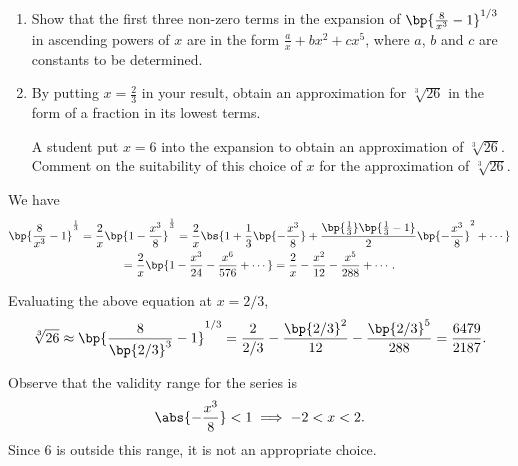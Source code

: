 \clearpage
\begin{problem}
    \begin{enumerate}
        \item Show that the first three non-zero terms in the expansion of $\bp{\frac8{x^3} - 1}^{1/3}$ in ascending powers of $x$ are in the form $\frac{a}x + bx^2 + cx^5$, where $a$, $b$ and $c$ are constants to be determined.
        \item By putting $x = \frac23$ in your result, obtain an approximation for $\sqrt[3]{26}$ in the form of a fraction in its lowest terms.

        A student put $x = 6$ into the expansion to obtain an approximation of $\sqrt[3]{26}$. Comment on the suitability of this choice of $x$ for the approximation of $\sqrt[3]{26}$.
    \end{enumerate}
\end{problem}
\begin{solution}
    \begin{ppart}
        We have
        \begin{gather*}
            \bp{\frac8{x^3} - 1}^{\frac13} = \frac2x \bp{1 - \frac{x^3}8}^{\frac13} = \frac2x \bs{1 + \frac13 \bp{-\frac{x^3}8} + \frac{\bp{\frac13}\bp{\frac13 - 1}}{2} \bp{-\frac{x^3}8}^2 + \cdots} \\
            = \frac2x \bp{1 - \frac{x^3}{24} - \frac{x^6}{576} + \cdots} = \frac2x - \frac{x^2}{12} - \frac{x^5}{288} + \cdots.
        \end{gather*}
    \end{ppart}
    \begin{ppart}
        Evaluating the above equation at $x = 2/3$, \[\sqrt[3]{26} \approx \bp{\frac8{\bp{2/3}^3} - 1}^{1/3} = \frac2{2/3} - \frac{\bp{2/3}^2}{12} - \frac{\bp{2/3}^5}{288} = \frac{6479}{2187}.\]

        Observe that the validity range for the series is \[\abs{-\frac{x^3}8} < 1 \implies -2 < x < 2.\] Since 6 is outside this range, it is not an appropriate choice.
    \end{ppart}
\end{solution}


